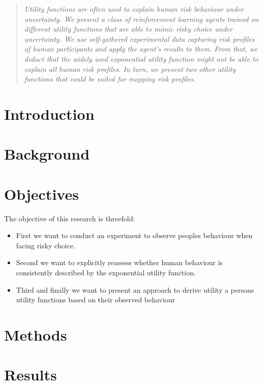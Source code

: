 \documentclass{article}
\begin{document}
\printAffiliationsAndNotice{\icmlEqualContribution} %

\begin{abstract}
\textit{Utility functions are often used to explain human risk behaviour under uncertainty. We present a class of reinforcement learning agents trained on different utility functions that are able to mimic risky choice under uncertainty. We use self-gathered experimental data capturing risk profiles of human participants and apply the agent's results to them. From that, we deduct that the widely used exponential utility function might not be able to explain all human risk profiles. In turn, we present two other utility functions that could be suited for mapping risk profiles.}
\end{abstract}

\section{Introduction}\label{sec:introduction}

\section{Background}\label{sec:background}

\section{Objectives}\label{sec:objectives}
The objective of this research is threefold:
\begin{itemize}
    \item First we want to conduct an experiment to observe peoples behaviour when facing risky choice. 
    \item Second we want to explicitly reassess whether human behaviour is consistently described by the exponential utility function.
    \item Third and finally we want to present an approach to derive utility a persons utility functions based on their observed behaviour
\end{itemize}


\section{Methods}\label{sec:methods}


\section{Results}\label{sec:results}

\end{document}
